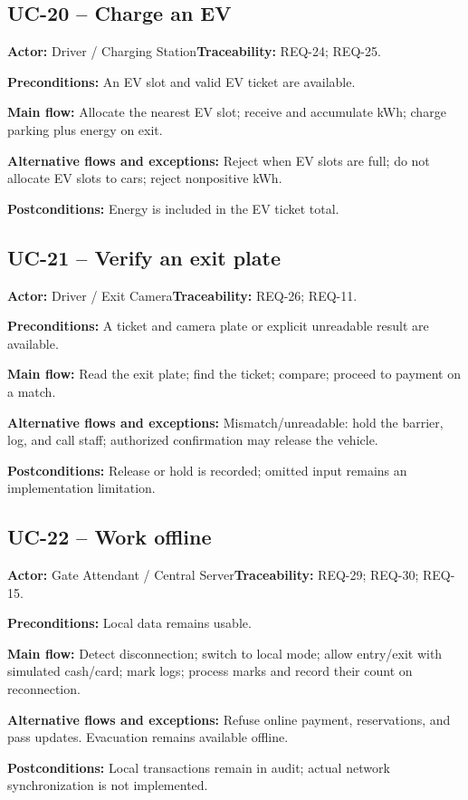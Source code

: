 \subsection{UC-20 -- Charge an EV}
\noindent\textbf{Actor:} Driver / Charging Station\quad\textbf{Traceability:} REQ-24; REQ-25.
\par\textbf{Preconditions:} An EV slot and valid EV ticket are available.
\par\textbf{Main flow:} Allocate the nearest EV slot; receive and accumulate kWh; charge parking plus energy on exit.
\par\textbf{Alternative flows and exceptions:} Reject when EV slots are full; do not allocate EV slots to cars; reject nonpositive kWh.
\par\textbf{Postconditions:} Energy is included in the EV ticket total.
\subsection{UC-21 -- Verify an exit plate}
\noindent\textbf{Actor:} Driver / Exit Camera\quad\textbf{Traceability:} REQ-26; REQ-11.
\par\textbf{Preconditions:} A ticket and camera plate or explicit unreadable result are available.
\par\textbf{Main flow:} Read the exit plate; find the ticket; compare; proceed to payment on a match.
\par\textbf{Alternative flows and exceptions:} Mismatch/unreadable: hold the barrier, log, and call staff; authorized confirmation may release the vehicle.
\par\textbf{Postconditions:} Release or hold is recorded; omitted input remains an implementation limitation.
\subsection{UC-22 -- Work offline}
\noindent\textbf{Actor:} Gate Attendant / Central Server\quad\textbf{Traceability:} REQ-29; REQ-30; REQ-15.
\par\textbf{Preconditions:} Local data remains usable.
\par\textbf{Main flow:} Detect disconnection; switch to local mode; allow entry/exit with simulated cash/card; mark logs; process marks and record their count on reconnection.
\par\textbf{Alternative flows and exceptions:} Refuse online payment, reservations, and pass updates. Evacuation remains available offline.
\par\textbf{Postconditions:} Local transactions remain in audit; actual network synchronization is not implemented.
